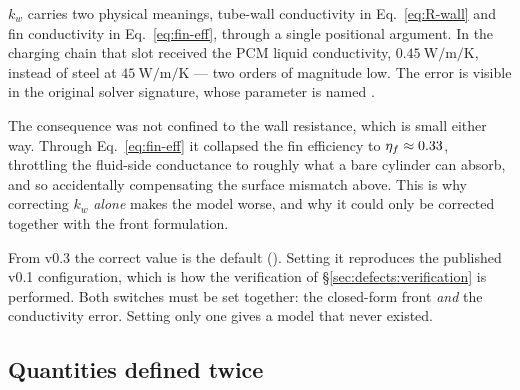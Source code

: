 \noindent{}

\medskip
$k_{w}$ carries two physical meanings, tube-wall conductivity in
Eq.~\eqref{eq:R-wall} and fin conductivity in Eq.~\eqref{eq:fin-eff}, through a
single positional argument. In the charging chain that slot received the PCM
liquid conductivity, $\SI{0.45}{\watt\per\meter\per\kelvin}$, instead of steel
at $\SI{45}{\watt\per\meter\per\kelvin}$ --- two orders of magnitude low. The
error is visible in the original solver signature, whose parameter is named
.

The consequence was not confined to the wall resistance, which is small either
way. Through Eq.~\eqref{eq:fin-eff} it collapsed the fin efficiency to
$\eta_{f}\approx 0.33$, throttling the fluid-side conductance to roughly what a
bare cylinder can absorb, and so accidentally compensating the surface mismatch
above. This is why correcting $k_{w}$ \emph{alone} makes the model worse, and
why it could only be corrected together with the front formulation.

From v0.3 the correct value is the default
(). Setting it 
reproduces the published v0.1 configuration, which is how the verification of
\S\ref{sec:defects:verification} is performed. Both switches must be set
together: the closed-form front \emph{and} the conductivity error. Setting only
one gives a model that never existed.

\subsection{Quantities defined twice}

